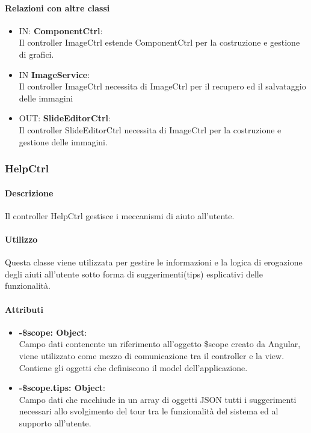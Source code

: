 	\paragraph{Relazioni con altre classi}
	\begin{itemize}
 	\item IN: \textbf{ComponentCtrl}:\\
	 	Il controller ImageCtrl estende ComponentCtrl per la costruzione e gestione di grafici.
	\item IN \textbf{ImageService}:\\
		Il controller ImageCtrl necessita di ImageCtrl per il recupero ed il salvataggio delle immagini
	\item OUT: \textbf{SlideEditorCtrl}:\\
		Il controller SlideEditorCtrl necessita di ImageCtrl per la costruzione e gestione delle immagini. 	
	\end{itemize}

\newpage

\subsubsection{HelpCtrl}
      \paragraph{Descrizione}
	Il controller HelpCtrl gestisce i meccanismi di aiuto all'utente.
	
	\paragraph{Utilizzo}
	Questa classe viene utilizzata per gestire le informazioni e la logica di erogazione degli aiuti all'utente sotto forma di suggerimenti(tips) esplicativi delle funzionalità.
	
	\paragraph{Attributi}
	\begin{itemize}
		\item \textbf{-\$scope: Object}:\\
				Campo dati contenente un riferimento all'oggetto \$scope creato da Angular, viene utilizzato come mezzo di comunicazione tra il controller e la view. Contiene gli oggetti che definiscono il model dell'applicazione.
		\item \textbf{-\$scope.tips: Object}:\\
				Campo dati che racchiude in un array di oggetti JSON tutti i suggerimenti necessari allo svolgimento del tour tra le funzionalità del sistema ed al supporto all'utente. 
	\end{itemize}
	

